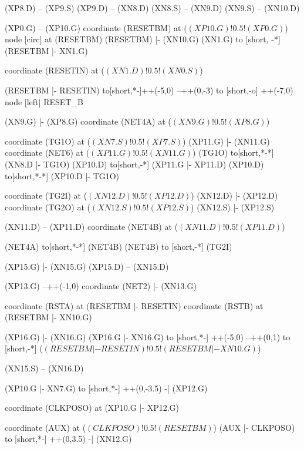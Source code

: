 \begin{circuitikz}[american]
	(XP8.D) -- (XP9.S)
	(XP9.D) -- (XN8.D)
	(XN8.S) -- (XN9.D)
	(XN9.S) -- (XN10.D)
	
	(XP0.G) -- (XP10.G)
	coordinate (RESETBM) at ($(XP10.G)!0.5!(XP0.G)$)%
	node [circ] at (RESETBM){}
	(RESETBM) |- (XN10.G)
	(XN1.G) to [short, -*] (RESETBM |- XN1.G)%
	
	
	coordinate (RESETIN) at ($(XN1.D)!0.5!(XN0.S)$)
	
	(RESETBM |- RESETIN) to[short,*-]++(-5,0) --++(0,-3) to [short,-o] ++(-7,0) node [left] {RESET\_B}
	
	(XN9.G) |- (XP8.G)
	coordinate (NET4A) at ($(XN9.G)!0.5!(XP8.G)$)%
	
	
	coordinate (TG1O) at ($(XN7.S)!0.5!(XP7.S)$)
	(XP11.G) |- (XN11.G) 
	coordinate (NET6) at ($(XP11.G)!0.5!(XN11.G)$)
	(TG1O) to[short,*-*] (XN8.D |- TG1O) 
	(XP10.D) to[short,-*] (XP11.G |- XP11.D)
	(XP10.D) to[short,*-*] (XP10.D |- TG1O)
	
	
	coordinate (TG2I) at ($(XN12.D)!0.5!(XP12.D)$)
	(XN12.D) |- (XP12.D)
	coordinate (TG2O) at ($(XN12.S)!0.5!(XP12.S)$)
	(XN12.S) |- (XP12.S)	
	
	(XN11.D) -- (XP11.D)
	coordinate (NET4B) at ($(XN11.D)!0.5!(XP11.D)$) 
	
	(NET4A) to[short,*-*] (NET4B)
	(NET4B) to [short,-*] (TG2I)
	
	
	(XP15.G) |- (XN15.G)
	(XP15.D) -- (XN15.D)
	
	
	
	(XP13.G) --++(-1,0) coordinate (NET2) |- (XN13.G)
	
	coordinate (RSTA) at (RESETBM |- RESETIN)	
	coordinate (RSTB) at (RESETBM |- XN10.G)
	
	(XP16.G) |- (XN16.G)
	(XP16.G |- XN16.G) to [short,*-] ++(-5,0) --++(0,1) to [short,-*]
	($(RESETBM |- RESETIN)!0.5!(RESETBM |- XN10.G)$) 
	
	
	(XN15.S) -- (XN16.D)
	
	
	(XP10.G |- XN7.G) to [short,*-] ++(0,-3.5) -| (XP12.G)
	
	coordinate (CLKPOSO) at (XP10.G |- XP12.G)	
	
	coordinate (AUX) at ($(CLKPOSO)!0.5!(RESETBM)$)
	(AUX |- CLKPOSO) to [short,*-] ++(0,3.5) -| (XN12.G)
	

\end{circuitikz}
